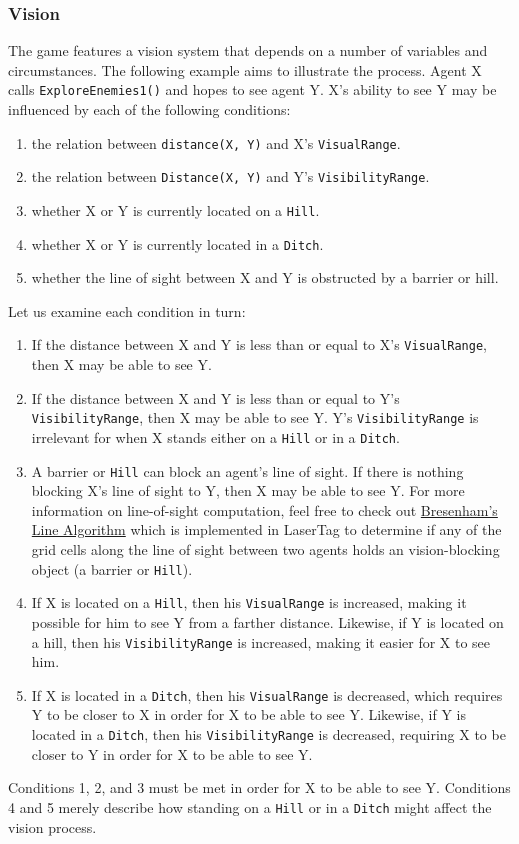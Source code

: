 \documentclass[
  a4paper,
  english,
  DIV=16,
  11pt,
  parskip=half,
  dvipsnames,
  listof=totoc,		     %
  index=totoc,		     %
  bibliography=totoc,	 %
]{scrartcl}
\begin{document}
\subsubsection{Vision} \label{sssec:vision}
%
The game features a vision system that depends on a number of variables and circumstances. The following example aims to illustrate the process. Agent X calls \texttt{ExploreEnemies1()} and hopes to see agent Y. X's ability to see Y may be influenced by each of the following conditions:
%
\begin{enumerate}
  \item the relation between \texttt{distance(X, Y)} and X's \texttt{VisualRange}.
  \item the relation between \texttt{Distance(X, Y)} and Y's \texttt{VisibilityRange}.
  \item whether X or Y is currently located on a \texttt{Hill}.
  \item whether X or Y is currently located in a \texttt{Ditch}.
  \item whether the line of sight between X and Y is obstructed by a barrier or hill.
\end{enumerate}
%
Let us examine each condition in turn:
%
\begin{enumerate}
  \item If the distance between X and Y is less than or equal to X's \texttt{VisualRange}, then X may be able to see Y.
  \item If the distance between X and Y is less than or equal to Y's \texttt{VisibilityRange}, then X may be able to see Y. Y's \texttt{VisibilityRange} is irrelevant for when X stands either on a \texttt{Hill} or in a \texttt{Ditch}.
  \item A barrier or \texttt{Hill} can block an agent's line of sight. If there is nothing blocking X's line of sight to Y, then X may be able to see Y. For more information on line-of-sight computation, feel free to check out \href{http://tech-algorithm.com/articles/drawing-line-using-bresenham-algorithm/}{Bresenham's Line Algorithm} which is implemented in LaserTag to determine if any of the grid cells along the line of sight between two agents holds an vision-blocking object (a barrier or \texttt{Hill}).
  \item If X is located on a \texttt{Hill}, then his \texttt{VisualRange} is increased, making it possible for him to see Y from a farther distance. Likewise, if Y is located on a hill, then his \texttt{VisibilityRange} is increased, making it easier for X to see him.
  \item If X is located in a \texttt{Ditch}, then his \texttt{VisualRange} is decreased, which requires Y to be closer to X in order for X to be able to see Y. Likewise, if Y is located in a \texttt{Ditch}, then his \texttt{VisibilityRange} is decreased, requiring X to be closer to Y in order for X to be able to see Y.
\end{enumerate}
%
Conditions 1, 2, and 3 must be met in order for X to be able to see Y. Conditions 4 and 5 merely describe how standing on a \texttt{Hill} or in a \texttt{Ditch} might affect the vision process.
%
\end{document}
